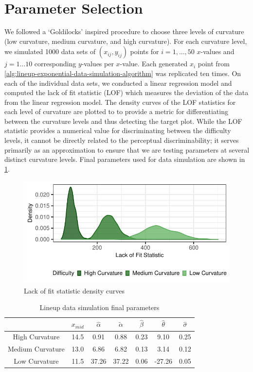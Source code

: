 \documentclass[print]{nuthesis}
\begin{document}
\hypertarget{lineups-parameter-selection}{%
\section{Parameter Selection}\label{lineups-parameter-selection}}

We followed a `Goldilocks' inspired procedure to choose three levels of curvature (low curvature, medium curvature, and high curvature). For each curvature level, we simulated 1000 data sets of \((x_{ij}, y_{ij})\) points for \(i = 1,...,50\) \(x\)-values and \(j = 1...10\) corresponding \(y\)-values per \(x\)-value.
Each generated \(x_i\) point from \cref{alg:lineup-exponential-data-simulation-algorithm} was replicated ten times.
On each of the individual data sets, we conducted a linear regression model and computed the lack of fit statistic (LOF) which measures the deviation of the data from the linear regression model.
The density curves of the LOF statistics for each level of curvature are plotted  to to provide a metric for differentiating between the curvature levels and thus detecting the target plot.
While the LOF statistic provides a numerical value for discriminating between the difficulty levels, it cannot be directly related to the perceptual discriminability; it serves primarily as an approximation to ensure that we are testing parameters at several distinct curvature levels.
Final parameters used for data simulation are shown in \cref{tab:parameter-data}.

\begin{figure}[tbp]

{\centering \includegraphics[width=0.75\linewidth,]{thesis_files/figure-latex/lof-density-curves-1} 

}

\caption{Lack of fit statistic density curves}\label{fig:lof-density-curves}
\end{figure}

\begin{table}

\caption{\label{tab:parameter-data}Lineup data simulation final parameters}
\centering
\begin{tabular}[t]{ccccccc}
\toprule
 & $x_{mid}$ & $\hat\alpha$ & $\tilde\alpha$ & $\hat\beta$ & $\hat\theta$ & $\hat\sigma$\\
\midrule
High Curvature & 14.5 & 0.91 & 0.88 & 0.23 & 9.10 & 0.25\\
Medium Curvature & 13.0 & 6.86 & 6.82 & 0.13 & 3.14 & 0.12\\
Low Curvature & 11.5 & 37.26 & 37.22 & 0.06 & -27.26 & 0.05\\
\bottomrule
\end{tabular}
\end{table}
\end{document}
